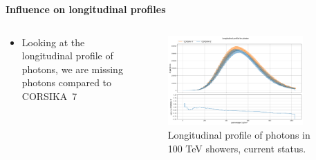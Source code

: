 \documentclass[aspectratio=1610, 9pt]{beamer}
\begin{document}
\begin{frame}

  \textbf{Influence on longitudinal profiles}
  \vspace{5mm}

    \begin{columns}[onlytextwidth]
        \begin{column}{0.4\textwidth}
            \begin{itemize}
              \item Looking at the longitudinal profile of photons, we are missing photons compared to CORSIKA~7
            \end{itemize}
        \end{column}
        \begin{column}{0.6\textwidth}
            \begin{figure}
                \centering
                \includegraphics[width=0.85\textwidth]{plots/long_photon_2023_full.png}
                \caption{Longitudinal profile of photons in 100 \si{\tera\electronvolt} showers, current status.}
            \end{figure}
        \end{column}
    \end{columns}
\end{frame}
\end{document}
